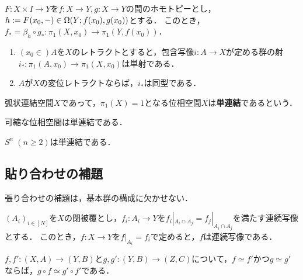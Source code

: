 \documentclass[uplatex,dvipdfmx]{jsreport}
\begin{document}
\begin{lemma}
    $F:X\times I\to Y$を$f:X\to Y,g:X\to Y$の間のホモトピーとし，$h:=F(x_0,-)\in\Omega(Y;f(x_0),g(x_0))$とする．
    このとき，$f_*=\beta_h\circ g_*:\pi_1(X,x_0)\to\pi_1(Y,f(x_0))$．
\end{lemma}

\begin{proposition}\mbox{}
    \begin{enumerate}
        \item $(x_0\in)A$を$X$のレトラクトとすると，包含写像$i:A\to X$が定める群の射$i_*:\pi_1(A,x_0)\to\pi_1(X,x_0)$は単射である．
        \item $A$が$X$の変位レトラクトならば，$i_*$は同型である．
    \end{enumerate}
\end{proposition}

\begin{definition}
    弧状連結空間$X$であって，$\pi_1(X)=1$となる位相空間$X$は\textbf{単連結}であるという．
\end{definition}
\begin{example}
    可縮な位相空間は単連結である．
\end{example}

\begin{proposition}
    $S^n\;(n\ge 2)$は単連結である．
\end{proposition}

\subsection{貼り合わせの補題}

\begin{tcolorbox}[colframe=ForestGreen, colback=ForestGreen!10!white,breakable,colbacktitle=ForestGreen!40!white,coltitle=black,fonttitle=\bfseries\sffamily,
title=]
    張り合わせの補題は，基本群の構成に欠かせない．
\end{tcolorbox}

\begin{lemma}[貼り合わせの補題]
    $(A_i)_{i\in[N]}$を$X$の閉被覆とし，$f_i:A_i\to Y$を$f_i|_{A_i\cap A_j}=f_j|_{A_i\cap A_j}$を満たす連続写像とする．
    このとき，$f:X\to Y$を$f|_{A_i}=f_i$で定めると，$f$は連続写像である．
\end{lemma}

\begin{proposition}
    $f,f':(X,A)\to(Y,B)$と$g,g':(Y,B)\to(Z,C)$について，$f\simeq f'$かつ$g\simeq g'$ならば，$g\circ f\simeq g'\circ f'$である．
\end{proposition}
\end{document}
